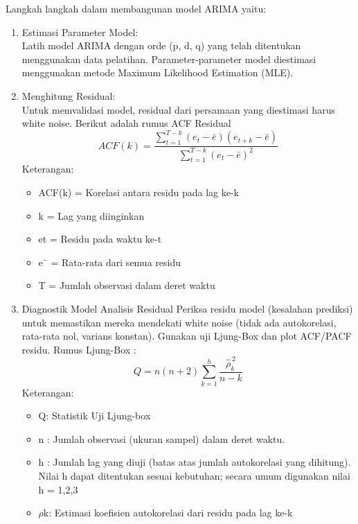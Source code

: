 Langkah langkah dalam membangunan model ARIMA yaitu:
\begin{enumerate}
    \item Estimasi Parameter Model: \\ 
    Latih model ARIMA dengan orde (p, d, q) yang telah ditentukan menggunakan data pelatihan. 
    Parameter-parameter model diestimasi menggunakan metode Maximum Likelihood Estimation (MLE).
    \item Menghitung Residual: \\
    Untuk memvalidasi model, residual dari persamaan yang diestimasi harus white noise. 
    Berikut adalah rumus ACF Residual
    \begin{equation}
        ACF(k) = 
        \frac{
            \displaystyle \sum_{t=1}^{T-k} (e_t - \bar{e})(e_{t+k} - \bar{e})
        }{
            \displaystyle \sum_{t=1}^{T-k} (e_t - \bar{e})^2
        }
        \label{eq:acf_formula}
    \end{equation}
    Keterangan:
    \begin{itemize}
        \item ACF(k) = Korelasi antara residu pada lag ke-k
        \item k = Lag yang diinginkan
        \item et = Residu pada waktu ke-t 
        \item e¯ = Rata-rata dari semua residu
        \item T = Jumlah observasi dalam deret waktu
    \end{itemize}
    \item Diagnostik Model Analisis Residual
    Periksa residu model (kesalahan prediksi) untuk memastikan mereka mendekati white noise (tidak ada autokorelasi, rata-rata nol, varians konstan). 
    Gunakan uji Ljung-Box dan plot ACF/PACF residu. Rumus Ljung-Box :
    \begin{equation}
        Q = n(n+2) \sum_{k=1}^{h} \frac{\hat{\rho}_k^{\,2}}{n - k}
        \label{eq:ljung_box_q}
    \end{equation}
    Keterangan:
    \begin{itemize}
        \item Q: Statistik Uji Ljung-box
        \item n : Jumlah observasi (ukuran sampel) dalam deret waktu.
        \item h : Jumlah lag yang diuji (batas atas jumlah autokorelasi yang dihitung). Nilai h dapat ditentukan sesuai kebutuhan; secara umum digunakan nilai h = 1,2,3
        \item $\rho$k: Estimasi koefisien autokorelasi dari residu pada lag ke-k
    \end{itemize}
\end{enumerate}